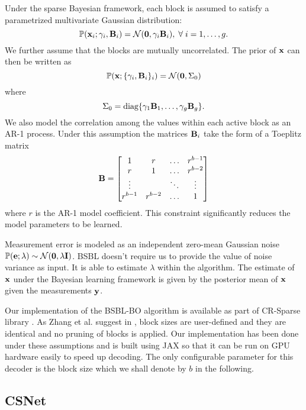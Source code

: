 Under the sparse Bayesian framework, each block
is assumed to satisfy a parametrized multivariate
Gaussian distribution:
\begin{equation}
\mathbb{P}(\mathbf{x}_i ; \gamma_i, \mathbf{B}_i) 
= \mathcal{N}(\mathbf{0}, \gamma_i \mathbf{B}_i), \; \forall \; i=1,\dots,g.
\end{equation}
We further assume that the blocks are mutually uncorrelated.
The prior of $\mathbf{x}$ can then be written as
\begin{equation}
\mathbb{P}(\mathbf{x}; \{ \gamma_i, \mathbf{B}_i\}_i ) = \mathcal{N}(\mathbf{0}, \Sigma_0)
\end{equation}
where
\begin{equation}
\Sigma_0 = \text{diag}\{\gamma_1 \mathbf{B}_1, \dots, \gamma_g \mathbf{B}_g \}.
\end{equation}
We also model the correlation among the values
within each active block as an AR-1 process.
Under this assumption the matrices
$\mathbf{B}_i$ take the form of a Toeplitz matrix
\begin{equation}
\mathbf{B} = \begin{bmatrix}
1 & r & \dots & r^{b-1}\\
r & 1 & \dots & r^{b-2}\\
\vdots &  & \ddots & \vdots\\
r^{b-1} & r^{b-2} & \dots & 1
\end{bmatrix}
\end{equation}
where $r$ is the AR-1 model coefficient.
This constraint significantly reduces the model parameters to be learned.

Measurement error is modeled as an independent zero-mean Gaussian
noise $\mathbb{P}(\mathbf{e}; \lambda) \sim \mathcal{N}(\mathbf{0}, \lambda \mathbf{I})$.
BSBL doesn't require us to provide the value of noise variance
as input.
It is able to estimate $\lambda$ within the algorithm.
The estimate of $\mathbf{x}$ under the Bayesian learning framework
is given by the posterior mean of $\mathbf{x}$ given the measurements $\mathbf{y}$.

Our implementation of the BSBL-BO algorithm is available as part of
CR-Sparse library \cite{kumar2021cr}.
As Zhang et al. suggest in \cite{zhang2012compressed},
block sizes are user-defined and they are identical and
no pruning of blocks is applied. Our implementation has been
done under these assumptions and is built using JAX so that it can
be run on GPU hardware easily to speed up decoding.
The only configurable parameter for this decoder is the block size
which we shall denote by $b$ in the following.

\subsection{CSNet}

